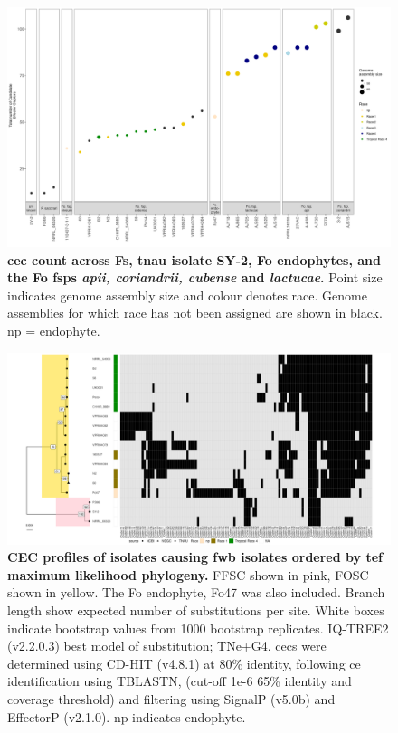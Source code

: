 \begin{figure}
    \centering
    \includegraphics[width=22cm]{Figures/CecDistribinFspOfInterest.png}
    \captionsetup{width=20cm}
    \caption[\Acl{cec} count across \acl{Fs}, \ac{tnau} isolate SY-2, \acl{Fo} endophytes, and the \ac{Fo} \acp{fsp} \textit{apii, coriandrii, cubense} and \textit{lactucae}.]{\textbf{\Acf{cec} count across \acl{Fs}, \ac{tnau} isolate SY-2, \acf{Fo} endophytes, and the \ac{Fo} \acp{fsp} \textit{apii, coriandrii, cubense} and \textit{lactucae}.} Point size indicates genome assembly size and colour denotes race. Genome assemblies for which race has not been assigned are shown in black. np = endophyte.}
    \label{fig:CECcount}
\end{figure}


\begin{figure}
    \centering
    \includegraphics[width=\textwidth]{Figures/HeatmapAndPhylo_BananaPathOnly.png}
    \captionsetup{width=24cm}
    \caption[CEC profiles of isolates  causing \acl{fwb} isolates ordered by maximum likelihood phylogeny.]{\textbf{CEC profiles of isolates  causing \acl{fwb} isolates ordered by \ac{tef} maximum likelihood phylogeny.} \ac{FFSC} shown in pink, \ac{FOSC} shown in yellow. The \ac{Fo} endophyte, Fo47 was also included. Branch length show expected number of substitutions per site. White boxes indicate bootstrap values from 1000 bootstrap replicates. IQ-TREE2 (v2.2.0.3) best model of substitution; TNe+G4. \Acp{cec} were determined using CD-HIT (v4.8.1) at 80\% identity, following \ac{ce} identification using TBLASTN, (cut-off 1e-6 65\% identity and coverage threshold) and filtering using SignalP (v5.0b) and EffectorP (v2.1.0). np indicates endophyte.}
    \label{fig:MaeiHeatmap-banana}
\end{figure}


